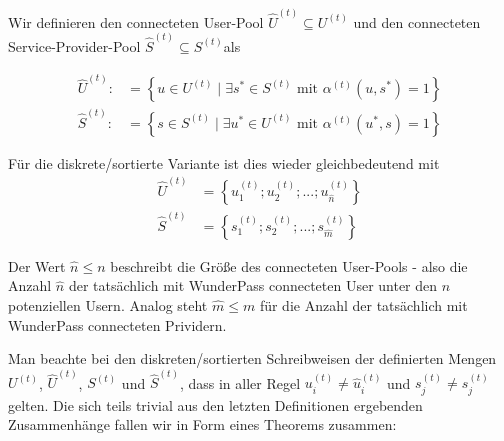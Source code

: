 \begin{Def}\label{defPools}

Wir definieren den connecteten User-Pool $\widehat{U}^{(t)} \subseteq U^{(t)}$ und den connecteten Service-Provider-Pool $\widehat{S}^{(t)} \subseteq S^{(t)}$als

\begin{align}
\widehat{U}^{(t)}:&= \left\{u \in U^{(t)} \mid \exists s^{*} \in S^{(t)} \textrm{ mit } \alpha^{(t)}(u, s^{*}) = 1 \right\} \tag{i} \\ 
\widehat{S}^{(t)}:&= \left\{s \in S^{(t)} \mid \exists u^{*} \in U^{(t)} \textrm{ mit } \alpha^{(t)}(u^{*}, s) = 1 \right\} \tag{ii}
\end{align}

\vspace{0.3cm}

Für die diskrete/sortierte Variante ist dies wieder gleichbedeutend mit
\begin{align}
\widehat{U}^{(t)} &= \left\{ u^{(t)}_1; u^{(t)}_2;...; u^{(t)}_{\widehat{n}} \right\} \tag{iii} \\ 
\widehat{S}^{(t)} &= \left\{ s^{(t)}_1; s^{(t)}_2;...; s^{(t)}_{\widehat{m}}\right\} \tag{iv}
\end{align}

\vspace{0.6cm}

Der Wert $\widehat{n} \leq n$ beschreibt die Größe des connecteten User-Pools - also die Anzahl $\widehat{n}$ der tatsächlich mit WunderPass connecteten User unter den $n$ potenziellen Usern. Analog steht $\widehat{m} \leq m$ für die Anzahl der tatsächlich mit WunderPass connecteten Prividern.

\end{Def}

\vspace{1cm}

Man beachte bei den diskreten/sortierten Schreibweisen der definierten Mengen $U^{(t)}$, $\widehat{U}^{(t)}$, $S^{(t)}$ und $\widehat{S}^{(t)}$, dass in aller Regel $u^{(t)}_i \neq \widehat{u}^{(t)}_i$ und $s^{(t)}_j \neq \widehat{s}^{(t)}_j$ gelten. Die sich teils trivial aus den letzten Definitionen ergebenden Zusammenhänge fallen wir in Form eines Theorems zusammen:

\vspace{0.3cm}

